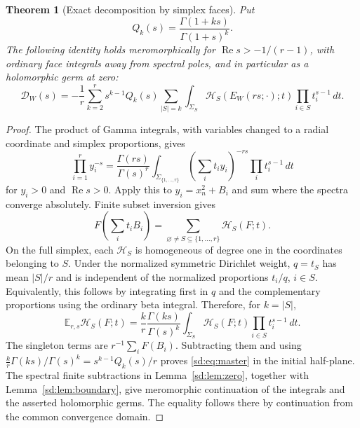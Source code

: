 \documentclass[11pt,a4paper]{article}
\numberwithin{equation}{section}
\newtheorem{theorem}{Theorem}[section]
\theoremstyle{definition}
\theoremstyle{remark}
\begin{document}
\begin{theorem}[Exact decomposition by simplex faces]
\label{sd:thm:master}
Put
\begin{equation}\label{sd:eq:Q}
 Q_k(s)=\frac{\Gamma(1+ks)}{\Gamma(1+s)^k}.
\end{equation}
The following identity holds meromorphically for
$\operatorname{Re}s>-1/(r-1)$, with ordinary face integrals away
from spectral poles, and in particular as a holomorphic germ at zero:
\begin{equation}\label{sd:eq:master}
 \boxed{\displaystyle
 \mathcal D_W(s)=-\frac1r\sum_{k=2}^{r}s^{k-1}Q_k(s)
   \sum_{|S|=k}\int_{\Sigma_S}
     \mathcal H_S(E_W(rs;\cdot);t)
                         \prod_{i\in S}t_i^{s-1}\,dt.}
\end{equation}
\end{theorem}
\begin{proof}
The product of Gamma integrals, with variables changed to a radial
coordinate and simplex proportions, gives
\[
 \prod_{i=1}^r y_i^{-s}
 =\frac{\Gamma(rs)}{\Gamma(s)^r}
   \int_{\Sigma_{\{1,\ldots,r\}}}
        \left(\sum_i t_i y_i\right)^{-rs}
                            \prod_i t_i^{s-1}\,dt
\]
for $y_i>0$ and $\operatorname{Re}s>0$.  Apply this to
$y_i=x_n^2+B_i$ and sum where the spectra converge absolutely.
Finite subset inversion gives
\[
 F\!\left(\sum_i t_iB_i\right)
       =\sum_{\varnothing\ne S\subseteq\{1,\ldots,r\}}
                    \mathcal H_S(F;t).
\]
On the full simplex, each $\mathcal H_S$ is homogeneous of degree one
in the coordinates belonging to $S$.  Under the normalized symmetric
Dirichlet weight, $q=t_S$ has mean $|S|/r$ and is independent of the
normalized proportions $t_i/q$, $i\in S$.  Equivalently, this follows
by integrating first in $q$ and the complementary proportions using
the ordinary beta integral.  Therefore, for $k=|S|$,
\[
 \mathbb E_{r,s}\mathcal H_S(F;t)
 =\frac{k}{r}\frac{\Gamma(ks)}{\Gamma(s)^k}
       \int_{\Sigma_S}\mathcal H_S(F;t)
                                 \prod_{i\in S}t_i^{s-1}\,dt.
\]
The singleton terms are $r^{-1}\sum_iF(B_i)$.  Subtracting them and
using
$\frac{k}{r}\Gamma(ks)/\Gamma(s)^k=s^{k-1}Q_k(s)/r$
proves \eqref{sd:eq:master} in the initial half-plane.
The spectral finite subtractions in Lemma~\ref{sd:lem:zero}, together
with Lemma~\ref{sd:lem:boundary}, give meromorphic continuation of the
integrals and the asserted holomorphic germs.  The equality follows
there by continuation from the common convergence domain.
\end{proof}
\end{document}
